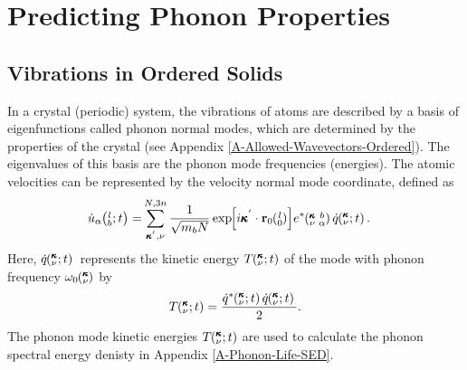 \documentclass[letterpaper,12pt]{article}
\newcommand{\EXP}[1]{\exp\mspace{-5.0mu}\left[#1\right]\mspace{-3.0mu}}
\newcommand{\SUMprime}[2]{\ifthenelse{\equal{#1}{0}}{\sum_{\alpha_{#2},b_{#2},l_{#2}}^{3,n,N}} {\ifthenelse{\equal{#1}{1}}{\sum_{\alpha_{#2},b_{#2}}^{3,n}}{\sum_{\pmb{\kappa}^{'}#2,\nu#2}^{N,3n}}}}
\newcommand{\ab}[2]{\mspace{-4.0mu}\left(\mspace{-8.0mu}\begin{smallmatrix}&\ifthenelse{\equal{#1}{}}{a}{#1} \\&\ifthenelse{\equal{#2}{}}{b}{#2}\end{smallmatrix}\mspace{-3.0mu}\right)}
\newcommand{\kvba}{\mspace{-4.0mu}\left(\mspace{-8.0mu}\begin{smallmatrix} &\pmb{\kappa} &b \\ &\nu &\alpha\end{smallmatrix}\mspace{-3.0mu}\right)}
\newcommand{\kvt}{\mspace{-4.0mu}\left(\mspace{-8.0mu}\begin{smallmatrix}&\pmb{\kappa} \\&\nu\end{smallmatrix}\mspace{-2.0mu};t\right)}
\newcommand{\kv}{\mspace{-4.0mu}\left(\mspace{-8.0mu}\begin{smallmatrix}&\pmb{\kappa} \\&\nu\end{smallmatrix}\mspace{-3.0mu}\right)}
\newcommand{\lbt}{\mspace{-4.0mu}\left(\mspace{-8.0mu}\begin{smallmatrix}&l \\&b\end{smallmatrix}\mspace{-2.0mu};t\right)}
\begin{document}
\section{\label{A-Predicting-Phonons}Predicting Phonon Properties}
\subsection{\label{A-Phonon-Normal-Modes}Vibrations in Ordered Solids}
In a crystal (periodic) system, the vibrations of atoms are described by a basis of eigenfunctions called phonon normal modes, which are determined by the properties of the crystal (see Appendix \ref{A-Allowed-Wavevectors-Ordered}). The eigenvalues of this basis are the phonon mode frequencies (energies).\cite{dove1993,wallace1972} The atomic velocities can be represented by the velocity normal mode coordinate, defined as 
\cite{dove1993}
\begin{equation}\label{E:udot_HLD}
\begin{split}
\dot{u}_{\alpha}\lbt = &\SUMprime{2}{} \frac{1}{\sqrt{m_bN}} \EXP{i\pmb{\kappa}^{'}\cdot\mathbf{r}_0\ab{l}{0}} e^*\kvba \dot{q}\kvt{}{}{}.
\end{split}
\end{equation}
Here, $\dot{q}\kvt{}{}{}$ represents the kinetic energy $T \kvt$ of the mode with phonon frequency $\omega_0\kv$ by
\cite{dove1993}
\begin{equation}\label{E:udot_HLD}
\begin{split}
T \kvt= \frac{\dot{q}^*\kvt{}{}{}\dot{q}\kvt{}{}{}}{2}.
\end{split}
\end{equation}
The phonon mode kinetic energies $T \kvt$ are used to calculate the phonon spectral energy denisty in Appendix \ref{A-Phonon-Life-SED}.
\end{document}
